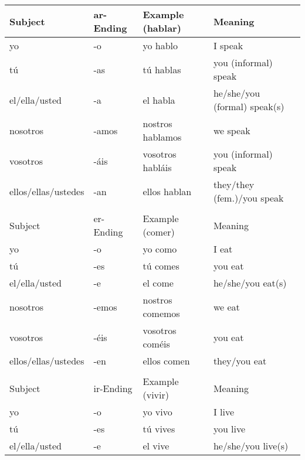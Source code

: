 \documentclass[a4paper,12pt]{article}
\begin{document}
\begin{table}[H]
\centering
\begin{tabular}{llll}
  Subject             & ar-Ending & Example (hablar) & Meaning                      \\
  \toprule
  yo                  & -o        & yo hablo         & I speak                      \\
  tú                  & -as       & tú hablas        & you (informal) speak         \\
  el/ella/usted       & -a        & el habla         & he/she/you (formal) speak(s) \\
  nosotros            & -amos     & nostros hablamos & we speak                     \\
  vosotros            & -áis      & vosotros habláis & you (informal) speak         \\
  ellos/ellas/ustedes & -an       & ellos hablan     & they/they (fem.)/you speak   \\
  \midrule
                      &           &                  &                              \\
  Subject             & er-Ending & Example (comer)  & Meaning                      \\
  \toprule
  yo                  & -o        & yo como          & I eat                        \\
  tú                  & -es       & tú comes         & you eat                      \\
  el/ella/usted       & -e        & el come          & he/she/you eat(s)            \\
  nosotros            & -emos     & nostros comemos  & we eat                       \\
  vosotros            & -éis      & vosotros coméis  & you eat                      \\
  ellos/ellas/ustedes & -en       & ellos comen      & they/you eat                 \\
  \midrule
                      &           &                  &                              \\
  Subject             & ir-Ending & Example (vivir)  & Meaning                      \\
  \toprule
  yo                  & -o        & yo vivo          & I live                       \\
  tú                  & -es       & tú vives         & you live                     \\
  el/ella/usted       & -e        & el vive          & he/she/you live(s)           \\

\end{tabular}
\end{table}
\end{document}

